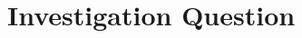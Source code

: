 \documentclass[twocolumn]{article} %
\begin{document}









\section{Investigation Question}
\end{document}
